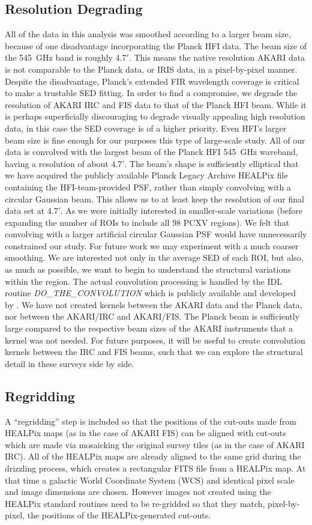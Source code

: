 \subsection{Resolution Degrading}
     All of the data in this analysis was smoothed according to a larger beam size, because of one disadvantage incorporating the Planck HFI data. The beam size of the 545~GHz band is roughly 4.7$'$. This means the native resolution AKARI data is not comparable to the Planck data, or IRIS data, in a pixel-by-pixel manner. Despite the disadvantage, Planck’s extended FIR wavelength coverage is critical to make a trustable SED fitting. In order to find a compromise, we degrade the resolution of AKARI IRC and FIS data to that of the Planck HFI beam. While it is perhaps superficially discouraging to degrade visually appealing high resolution data, in this case the SED coverage is of a higher priority. Even HFI’s larger beam size is fine enough for our purposes this type of large-scale study.
     All of our data is convolved with the largest beam of the Planck HFI 545~GHz waveband, having a resolution of about 4.7$’$. The beam’s shape is sufficiently elliptical that we have acquired the publicly available Planck Legacy Archive HEALPix file containing the HFI-team-provided PSF, rather than simply convolving with a circular Gaussian beam. This allows us to at least keep the resolution of our final data set at 4.7$’$. As we were initially interested in smaller-scale variations (before expanding the number of ROIs to include all 98 PCXV regions). We felt that convolving with a larger artificial circular Gaussian PSF would have unnecessarily constrained our study. For future work we may experiment with a much coarser smoothing. 
     We are interested not only in the average SED of each ROI, but also, as much as possible, we want to begin to understand the structural variations within the region. The actual convolution processing is handled by the IDL routine \textit{DO\_THE\_CONVOLUTION} which is publicly available and developed by \cite{aniano11}.
     We have not created kernels between the AKARI data and the Planck data, nor between the AKARI/IRC and AKARI/FIS.  The Planck beam is sufficiently large compared to the respective beam sizes of the AKARI instruments that a kernel was not needed. For future purposes, it will be useful to create convolution kernels between the IRC and FIS beams, such that we can explore the structural detail in these surveys side by side.
\subsection{Regridding}
     A ``regridding” step is included so that the positions of the cut-outs made from HEALPix maps (as in the case of AKARI FIS) can be aligned with cut-outs which are made via mosaicking the original survey tiles (as in the case of AKARI IRC). All of the HEALPix maps are already aligned to the same grid during the drizzling process, which creates a rectangular FITS file from a HEALPix map. At that time a galactic World Coordinate System (WCS) and identical pixel scale and image dimensions are chosen. However images not created using the HEALPix standard routines need to be re-gridded so that they match, pixel-by-pixel, the positions of the HEALPix-generated cut-outs.
